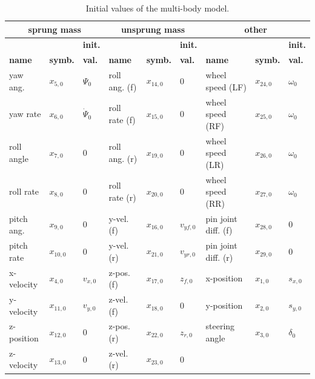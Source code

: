 \documentclass[11pt,a4paper]{article}
\renewcommand{\^}[1]{^{(#1)}}
\begin{document}
\begin{table}[h!tb]
\caption{Initial values of the multi-body model.}
\begin{center}\label{tab:fullModelInitialStates}
\begin{tabular}{lllllllll}
	\hline 
	\multicolumn{3}{c}{\textbf{sprung mass}} & \multicolumn{3}{c}{\textbf{unsprung mass}} & \multicolumn{3}{c}{\textbf{other}} \\ \hline
	     &       & \textbf{init.} &      &       & \textbf{init.} &      &       & \textbf{init.}\\ 
	\textbf{name} & \textbf{symb.} & \textbf{val.}  & \textbf{name} & \textbf{symb.} & \textbf{val.} & \textbf{name} & \textbf{symb.} & \textbf{val.} \\ \hline
	yaw ang.   & $x_{5,0}$  & $\Psi_0$       & roll ang. (f) & $x_{14,0}$ & $0$        & wheel speed (LF) & $x_{24,0}$ & $\omega_0$ \\ 
	yaw rate   & $x_{6,0}$  & $\dot{\Psi}_0$ & roll rate (f) & $x_{15,0}$ & $0$        & wheel speed (RF) & $x_{25,0}$ & $\omega_0$ \\      
	roll angle & $x_{7,0}$  & $0$            & roll ang. (r) & $x_{19,0}$ & $0$        & wheel speed (LR) & $x_{26,0}$ & $\omega_0$ \\ 
	roll rate  & $x_{8,0}$  & $0$            & roll rate (r) & $x_{20,0}$ & $0$        & wheel speed (RR) & $x_{27,0}$ & $\omega_0$ \\ 
	pitch ang. & $x_{9,0}$  & $0$            & y-vel. (f) & $x_{16,0}$    & $v_{yf,0}$ & pin joint diff. (f) & $x_{28,0}$ & $0$ \\ 
	pitch rate & $x_{10,0}$ & $0$            & y-vel. (r) & $x_{21,0}$    & $v_{yr,0}$ & pin joint diff. (r) & $x_{29,0}$ & $0$ \\
	x-velocity & $x_{4,0}$  & $v_{x,0}$      & z-pos. (f) & $x_{17,0}$    & $z_{f,0}$  & x-position & $x_{1,0}$ & $s_{x,0}$ \\ 
	y-velocity & $x_{11,0}$ & $v_{y,0}$      & z-vel. (f) & $x_{18,0}$    & $0$        & y-position & $x_{2,0}$ & $s_{y,0}$ \\
	z-position & $x_{12,0}$ & $0$            & z-pos. (r) & $x_{22,0}$    & $z_{r,0}$  & steering angle & $x_{3,0}$ & $\delta_0$ \\ 
	z-velocity & $x_{13,0}$ & $0$            & z-vel. (r) & $x_{23,0}$    & $0$ \\ \hline
\end{tabular}
\end{center}
\end{table}
\end{document}
